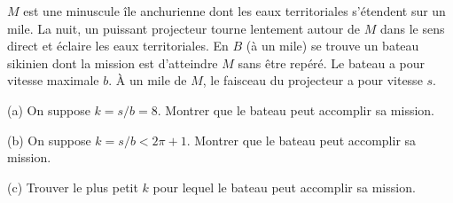 $M$ est une minuscule île anchurienne dont les eaux territoriales s'étendent sur un mile. La nuit, un puissant projecteur tourne lentement autour de $M$ dans le sens direct et éclaire les eaux territoriales. En $B$ (à un mile) se trouve un bateau sikinien dont la mission est d'atteindre $M$ sans être repéré. Le bateau a pour vitesse maximale $b$. À un mile de $M$, le faisceau du projecteur a pour vitesse $s$.

(a) On suppose $k = s/b = 8$. Montrer que le bateau peut accomplir sa mission.

(b) On suppose $k = s/b < 2\pi + 1$. Montrer que le bateau peut accomplir sa mission.

(c) Trouver le plus petit $k$ pour lequel le bateau peut accomplir sa mission.
